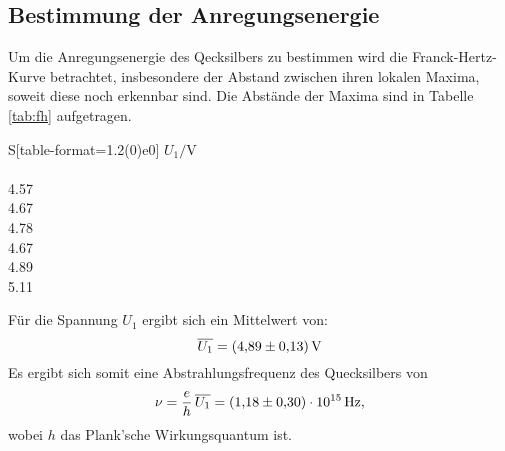 \subsection{Bestimmung der Anregungsenergie}
Um die Anregungsenergie des Qecksilbers zu bestimmen wird die Franck-Hertz-Kurve betrachtet, insbesondere der Abstand zwischen ihren lokalen Maxima, soweit diese noch erkennbar sind.
Die Abstände der Maxima sind in Tabelle \ref{tab:fh} aufgetragen.
\begin{table}[H]
    \caption{Messwerte der Energiekurve bei $\SI{140}{\degreeCelsius}$.}
    \label{tab:fh}
    \centering
    \begin{tabular}{S[table-format=1.2(0)e0]}
        \toprule
{$U_1/\si{\volt}$} \\
		 \\
4.57 \\
4.67 \\
4.78 \\
4.67 \\
4.89 \\
5.11 \\
       \bottomrule
    \end{tabular}
\end{table}

\noindent Für die Spannung $U_1$ ergibt sich ein Mittelwert von:
\begin{equation}
	\overline{U_1} = \SI{4.89\pm0.13}{\volt}
\end{equation}
Es ergibt sich somit eine Abstrahlungsfrequenz des Quecksilbers von
\begin{equation}
	\nu = \frac{e}{h}\, \overline{U_1} = \SI{1.18\pm0.3e15}{\hertz},
\end{equation}
wobei $h$\cite{plank} das Plank'sche Wirkungsquantum ist.

